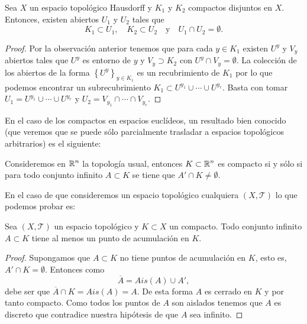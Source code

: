 \begin{prop}
Sea $\displaystyle X $ un espacio topológico Hausdorff y $\displaystyle K_{1} $ y $\displaystyle K_{2} $ compactos disjuntos en $\displaystyle X $. Entonces, existen abiertos $\displaystyle U_{1} $ y $\displaystyle U_{2} $ tales que 
\[K_{1}\subset U_{1}, \quad K_{2}\subset U_{2}\quad \text{y} \quad U_{1} \cap U_{2} = \emptyset .\]
\end{prop}
\begin{proof}
	Por la observación anterior tenemos que para cada $\displaystyle y \in K_{1} $ existen $\displaystyle U^{y} $ y $\displaystyle V_{y} $ abiertos tales que $\displaystyle U^{y} $ es entorno de $\displaystyle y $ y $\displaystyle V_{y}\supset K_{2} $ con $\displaystyle U^{y}\cap V_{y}= \emptyset $. La colección de los abiertos de la forma $\displaystyle \left\{ U^{y}\right\} _{y \in K_{1}} $ es un recubrimiento de $\displaystyle K_{1} $ por lo que podemos encontrar un subrecubrimiento $\displaystyle K _{1}\subset U^{y_{1}} \cup \cdots \cup U^{y_{r}} $. Basta con tomar $\displaystyle U_{1}=U^{y_{1}} \cup \cdots \cup U^{y_{r}} $ y $\displaystyle U_{2}=V_{y_{1}} \cap \cdots \cap V_{y_{r}} $.
\end{proof}
En el caso de los compactos en espacios euclídeos, un resultado bien conocido (que veremos que se puede sólo parcialmente trasladar a espacios topológicos arbitrarios) es el siguiente:
\begin{theorem}
Consideremos en $\displaystyle \mathbb{R}^{n} $ la topología usual, entonces $\displaystyle K\subset \mathbb{R}^{n} $ es compacto si y sólo si para todo conjunto infinito $\displaystyle A\subset K $ se tiene que $\displaystyle A' \cap K \neq \emptyset $. 
\end{theorem}
En el caso de que consideremos un espacio topológico cualquiera $\displaystyle \left(X, \mathcal{T}\right) $ lo que podemos probar es:
\begin{prop}
Sea $\displaystyle \left(X, \mathcal{T}\right) $ un espacio topológico y $\displaystyle K\subset X $ un compacto. Todo conjunto infinito $\displaystyle A \subset K $ tiene al menos un punto de acumulación en $\displaystyle K $. 
\end{prop}
\begin{proof}
Supongamos que $\displaystyle A \subset K $ no tiene puntos de acumulación en $\displaystyle K $, esto es, $\displaystyle A' \cap K = \emptyset $. Entonces como 
\[\overline{A} = Ais\left(A\right)\cup A' ,\]
debe ser que $\displaystyle \overline{A}\cap K = Ais\left(A\right)=A $. De esta forma $\displaystyle A $ es cerrado en $\displaystyle K $ y por tanto compacto. Como todos los puntos de $\displaystyle A $ son aislados tenemos que $\displaystyle A $ es discreto que contradice nuestra hipótesis de que $\displaystyle A $ sea infinito.
\end{proof}
